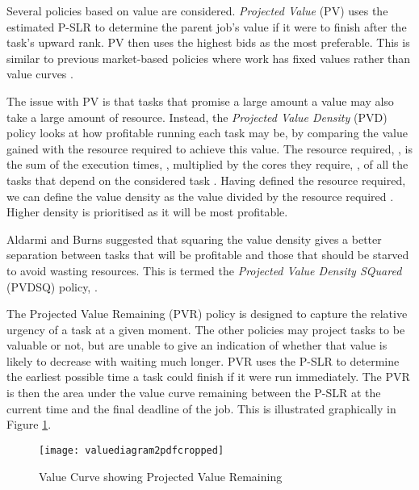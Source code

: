 \documentclass[english,british]{IEEEtran}
\begin{document}
Several policies based on value are considered. \emph{Projected Value}
(PV) uses the estimated P-SLR to determine the parent job's value
if it were to finish after the task's upward rank. PV then uses the
highest bids as the most preferable. This is similar to previous market-based
policies where work has fixed values rather than value curves .

The issue with PV is that tasks that promise a large amount a value
may also take a large amount of resource. Instead, the \emph{Projected
Value Density} (PVD) policy \cite{Locke1986} looks at how profitable
running each task may be, by comparing the value gained with the resource
required to achieve this value. The resource required, ,
is the sum of the execution times, , multiplied
by the cores they require, , of all the tasks
that depend on the considered task .
Having defined the resource required, we can define the value density
as the value divided by the resource required 
. Higher density is prioritised as it will be most profitable.

Aldarmi and Burns \cite{aldarmi1999} suggested that squaring the
value density gives a better separation between tasks that will be
profitable and those that should be starved to avoid wasting resources.
This is termed the \emph{Projected Value Density SQuared} (PVDSQ)
policy, .

The Projected Value Remaining (PVR) policy \cite{aburkimsherEngD14}
is designed to capture the relative urgency of a task at a given moment.
The other policies may project tasks to be valuable or not, but are
unable to give an indication of whether that value is likely to decrease
with waiting much longer. PVR uses the P-SLR to determine the earliest
possible time a task could finish if it were run immediately. The
PVR is then the area under the value curve remaining between the P-SLR
at the current time and the final deadline  of
the job. This is illustrated graphically in Figure \ref{fig:pvr-diag}.

\begin{figure}
\noindent \begin{centering}
\texttt{[image: valuediagram2pdfcropped]}
\par\end{centering}

\protect\caption{Value Curve showing Projected Value Remaining }


\label{fig:pvr-diag}
\end{figure}
\end{document}
